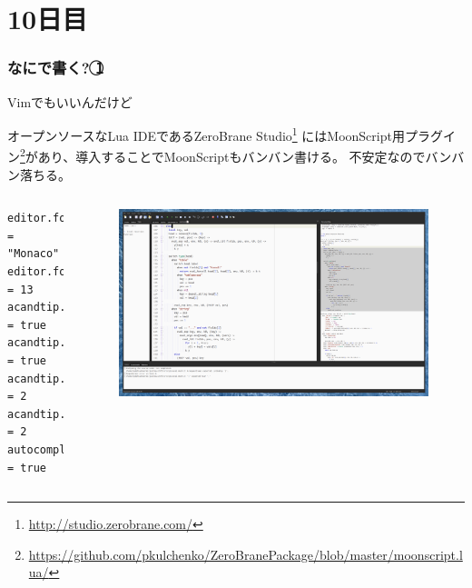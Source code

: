 \section{10日目}
\begin{frame}[fragile]
	\frametitle{なにで書く? \textcircled{1}}
	\alert{Vimでもいいんだけど}

	オープンソースなLua IDEであるZeroBrane Studio\footnote[frame]{\url{http://studio.zerobrane.com/}}%
	にはMoonScript用プラグイン\footnote[frame]{\url{https://github.com/pkulchenko/ZeroBranePackage/blob/master/moonscript.lua/}}があり、導入することでMoonScriptもバンバン書ける。
	不安定なのでバンバン落ちる。
	\begin{columns}
		\column[t]{.5\hsize}
		\tiny
		\begin{lstlisting}[numbers=none,language={[5.3]lua}]
editor.fontname = "Monaco"
editor.fontsize = 13
acandtip.droprest = true
acandtip.nodynwords = true
acandtip.startat = 2
acandtip.startegy = 2
autocomplete = true
		\end{lstlisting}
		\column[t]{.5\hsize}
		\begin{figure}[h]
			\centering
			\includegraphics[width=\columnwidth]{img/zbstudio.png}
		\end{figure}
	\end{columns}
\end{frame}

